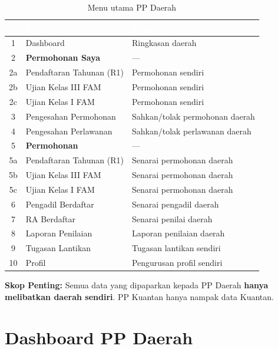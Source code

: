 \documentclass[12pt,a4paper]{report}
\begin{document}
\begin{table}[H]
\centering
{}
\begin{tabularx}{\textwidth}{c l X}
\toprule
\rowcolor{tableheader}
\textcolor{white}{\textbf{\#}} & \textcolor{white}{\textbf{Menu}} & \textcolor{white}{\textbf{Fungsi}} \\
\midrule
1 & Dashboard & Ringkasan daerah \\
2 & \textbf{Permohonan Saya} & --- \\
2a & \quad Pendaftaran Tahunan (R1) & Permohonan sendiri \\
2b & \quad Ujian Kelas III FAM & Permohonan sendiri \\
2c & \quad Ujian Kelas I FAM & Permohonan sendiri \\
3 & Pengesahan Permohonan & Sahkan/tolak permohonan daerah \\
4 & Pengesahan Perlawanan & Sahkan/tolak perlawanan daerah \\
5 & \textbf{Permohonan} & --- \\
5a & \quad Pendaftaran Tahunan (R1) & Senarai permohonan daerah \\
5b & \quad Ujian Kelas III FAM & Senarai permohonan daerah \\
5c & \quad Ujian Kelas I FAM & Senarai permohonan daerah \\
6 & Pengadil Berdaftar & Senarai pengadil daerah \\
7 & RA Berdaftar & Senarai penilai daerah \\
8 & Laporan Penilaian & Laporan penilaian daerah \\
9 & Tugasan Lantikan & Tugasan lantikan sendiri \\
10 & Profil & Pengurusan profil sendiri \\
\bottomrule
\end{tabularx}
\caption{Menu utama PP Daerah}
\end{table}

\begin{importantbox}
\textbf{Skop Penting:} Semua data yang dipaparkan kepada PP Daerah \textbf{hanya melibatkan daerah sendiri}. PP Kuantan hanya nampak data Kuantan.
\end{importantbox}

\section{Dashboard PP Daerah}
\end{document}
